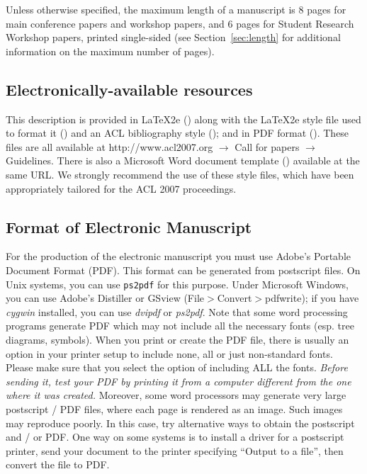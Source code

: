 \documentclass[11pt]{article}
\begin{document}
Unless otherwise specified, the maximum length of a manuscript is
$8$ pages for main conference papers and workshop
papers, and $6$ pages for Student Research Workshop papers,
printed single-sided (see Section~\ref{sec:length} for additional
information on the maximum number of pages).

\subsection{Electronically-available resources}

This description is provided in \LaTeX2e () along
with the \LaTeX2e style file used to format it ()
and an ACL bibliography style (); and in PDF format
(). These files are all available at
http://www.acl2007.org $\rightarrow$ Call for papers $\rightarrow$
Guidelines. There is also a Microsoft Word document template
() available at the same URL. We strongly
recommend the use of these style files, which have been
appropriately tailored for the ACL 2007 proceedings.


\subsection{Format of Electronic Manuscript}
\label{sect:pdf}

For the production of the electronic manuscript you must use Adobe's
Portable Document Format (PDF). This format can be generated from
postscript files. On Unix systems, you can use {\tt ps2pdf} for
this purpose. Under Microsoft Windows, you can use Adobe's Distiller
or GSview (File$>$Convert$>$pdfwrite); if you have \textit{cygwin}
installed, you can use \textit{dvipdf} or \textit{ps2pdf}. Note that
some word processing programs generate PDF which may not include all
the necessary fonts (esp. tree diagrams, symbols). When you print or
create the PDF file, there is usually an option in your printer setup
to include none, all or just non-standard fonts.  Please make sure
that you select the option of including ALL the fonts. {\em Before
sending it, test your PDF by printing it from a computer different
from the one where it was created.} Moreover, some word processors may
generate very large postscript / PDF files, where each page is rendered
as an image. Such images may reproduce poorly. In this case, try
alternative ways to obtain the postscript and / or PDF. One way on some
systems is to install a driver for a postscript printer, send your
document to the printer specifying ``Output to a file'', then convert
the file to PDF.
\end{document}
